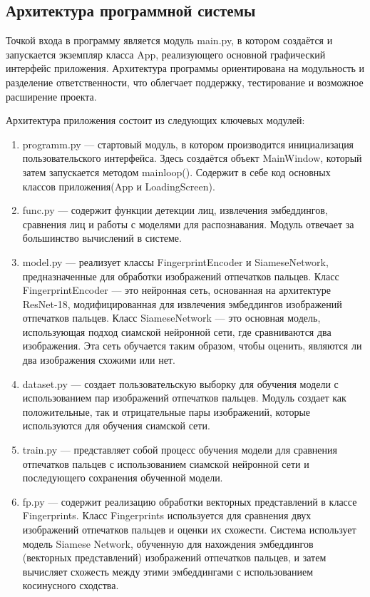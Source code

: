 \subsection{Архитектура программной системы}

Точкой входа в программу является модуль main.py, в котором создаётся и запускается экземпляр класса App, реализующего основной графический интерфейс приложения. Архитектура программы ориентирована на модульность и разделение ответственности, что облегчает поддержку, тестирование и возможное расширение проекта.

Архитектура приложения состоит из следующих ключевых модулей:
\begin{enumerate}
	\item programm.py — стартовый модуль, в котором производится инициализация пользовательского интерфейса. Здесь создаётся объект MainWindow, который затем запускается методом mainloop(). Содержит в себе код основных классов приложения(App и LoadingScreen).
	
	\item func.py — содержит функции детекции лиц, извлечения эмбеддингов, сравнения лиц и работы с моделями для распознавания. Модуль отвечает за большинство вычислений в системе.
	
	\item model.py — реализует классы FingerprintEncoder и SiameseNetwork, предназначенные для обработки изображений отпечатков пальцев. Класс FingerprintEncoder — это нейронная сеть, основанная на архитектуре ResNet-18, модифицированная для извлечения эмбеддингов изображений отпечатков пальцев. Класс SiameseNetwork — это основная модель, использующая подход сиамской нейронной сети, где сравниваются два изображения. Эта сеть обучается таким образом, чтобы оценить, являются ли два изображения схожими или нет.
	
	\item dataset.py — создает пользовательскую выборку для обучения модели с использованием пар изображений отпечатков пальцев. Модуль создает как положительные, так и отрицательные пары изображений, которые используются для обучения сиамской сети.
	
	\item train.py — представляет собой процесс обучения модели для сравнения отпечатков пальцев с использованием сиамской нейронной сети и последующего сохранения обученной модели.
	
	\item fp.py — содержит реализацию обработки векторных представлений в классе Fingerprints. Класс Fingerprints используется для сравнения двух изображений отпечатков пальцев и оценки их схожести. Система использует модель Siamese Network, обученную для нахождения эмбеддингов (векторных представлений) изображений отпечатков пальцев, и затем вычисляет схожесть между этими эмбеддингами с использованием косинусного сходства.
	

\end{enumerate}
